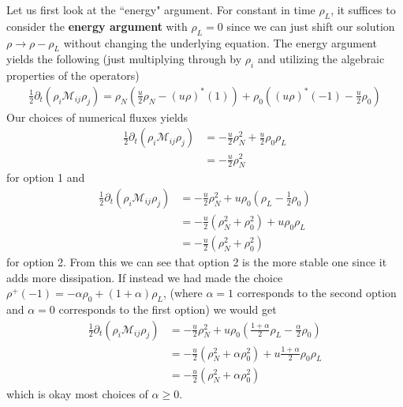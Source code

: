 \documentclass{report}
\numberwithin{equation}{section}
\begin{document}
Let us first look at the ``energy" argument. For constant in time $\rho_L$, it suffices to consider the \textbf{energy argument} with $\rho_L = 0$ since we can just shift our solution $\rho \rightarrow \rho - \rho_L$ without changing the underlying equation. The energy argument yields the following (just multiplying through by $\rho_i$ and utilizing the algebraic properties of the operators)
\begin{align}
    \frac{1}{2} \partial_t (\rho_i \mathcal{M}_{ij} \rho_j) = \rho_N \left(\frac{u}{2}\rho_N - (u \rho)^*(1) \right) + \rho_0 \left( (u \rho)^*(-1) - \frac{u}{2} \rho_0 \right)
\end{align}
Our choices of numerical fluxes yields
\begin{align}
\nonumber
    \frac{1}{2} \partial_t (\rho_i \mathcal{M}_{ij} \rho_j)  &= - \frac{u}{2}\rho_N^2  + \frac{u}{2} \rho_0   \rho_L
    \\
    &=  - \frac{u}{2}\rho_N^2 
\end{align}
for option 1 and 
\begin{align}
\nonumber
    \frac{1}{2} \partial_t (\rho_i \mathcal{M}_{ij} \rho_j)  &= - \frac{u}{2}\rho_N^2  +  u \rho_0 \left( \rho_L - \frac{1}{2} \rho_0 \right) 
    \\
    \nonumber
    &= -\frac{u}{2}\left(\rho_N^2 + \rho_0^2 \right) + u \rho_0 \rho_L
    \\
    &= -\frac{u}{2}\left(\rho_N^2 + \rho_0^2 \right) 
\end{align}
for option 2. From this we can see that option 2 is the more stable one since it adds more dissipation. If instead we had made the choice $\rho^+(-1) = - \alpha \rho_0 + (1+\alpha)\rho_L$, (where $\alpha = 1$ corresponds to the second option and $\alpha = 0$ corresponds to the first option) we would get
\begin{align}
    \nonumber
    \frac{1}{2} \partial_t (\rho_i \mathcal{M}_{ij} \rho_j) &= - \frac{u}{2}\rho_N^2  +  u \rho_0 \left( \frac{1+\alpha}{2}\rho_L - \frac{\alpha}{2} \rho_0 \right) 
    \\
    \nonumber
    &= -\frac{u}{2}\left(\rho_N^2 + \alpha \rho_0^2 \right) + u \frac{1+ \alpha}{2} \rho_0 \rho_L 
    \\
    &= -\frac{u}{2}\left(\rho_N^2 + \alpha \rho_0^2 \right)
\end{align}
which is okay most choices of $\alpha \geq 0$. 
\end{document}
